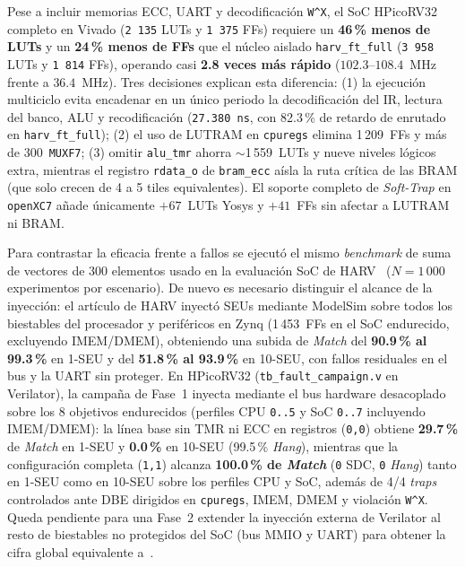 \documentclass[a4paper,10pt]{article}
\begin{document}
Pese a incluir memorias ECC, UART y decodificación \texttt{W\^{}X}, el SoC HPicoRV32 completo en Vivado (\texttt{2\,135} LUTs y \texttt{1\,375} FFs) requiere un \textbf{46\,\% menos de LUTs} y un \textbf{24\,\% menos de FFs} que el núcleo aislado \texttt{harv\_ft\_full} (\texttt{3\,958} LUTs y \texttt{1\,814} FFs), operando casi \textbf{2.8 veces más rápido} ($102.3$--$108.4$~MHz frente a $36.4$~MHz). Tres decisiones explican esta diferencia: (1) la ejecución multiciclo evita encadenar en un único periodo la decodificación del IR, lectura del banco, ALU y recodificación (\texttt{27.380~ns}, con 82.3\,\% de retardo de enrutado en \texttt{harv\_ft\_full}); (2) el uso de LUTRAM en \texttt{cpuregs} elimina 1\,209~FFs y más de 300~\texttt{MUXF7}; (3) omitir \texttt{alu\_tmr} ahorra $\sim$1\,559~LUTs y nueve niveles lógicos extra, mientras el registro \texttt{rdata\_o} de \texttt{bram\_ecc} aísla la ruta crítica de las BRAM (que solo crecen de 4 a 5 tiles equivalentes). El soporte completo de \textit{Soft-Trap} en \texttt{openXC7} añade únicamente $+67$~LUTs Yosys y $+41$~FFs sin afectar a LUTRAM ni BRAM.

Para contrastar la eficacia frente a fallos se ejecutó el mismo \textit{benchmark} de suma de vectores de 300 elementos usado en la evaluación SoC de HARV~\cite{santos2021microrel} ($N=1\,000$ experimentos por escenario). De nuevo es necesario distinguir el alcance de la inyección: el artículo de HARV inyectó SEUs mediante ModelSim sobre todos los biestables del procesador y periféricos en Zynq (1\,453~FFs en el SoC endurecido, excluyendo IMEM/DMEM), obteniendo una subida de \textit{Match} del \textbf{90.9\,\% al 99.3\,\%} en 1-SEU y del \textbf{51.8\,\% al 93.9\,\%} en 10-SEU, con fallos residuales en el bus y la UART sin proteger. En HPicoRV32 (\texttt{tb\_fault\_campaign.v} en Verilator), la campaña de Fase~1 inyecta mediante el bus hardware desacoplado sobre los 8 objetivos endurecidos (perfiles CPU \texttt{0..5} y SoC \texttt{0..7} incluyendo IMEM/DMEM): la línea base sin TMR ni ECC en registros (\texttt{0,0}) obtiene \textbf{29.7\,\%} de \textit{Match} en 1-SEU y \textbf{0.0\,\%} en 10-SEU (99.5\,\% \textit{Hang}), mientras que la configuración completa (\texttt{1,1}) alcanza \textbf{100.0\,\% de \textit{Match}} (\texttt{0} SDC, \texttt{0} \textit{Hang}) tanto en 1-SEU como en 10-SEU sobre los perfiles CPU y SoC, además de 4/4 \textit{traps} controlados ante DBE dirigidos en \texttt{cpuregs}, IMEM, DMEM y violación \texttt{W\^{}X}. Queda pendiente para una Fase~2 extender la inyección externa de Verilator al resto de biestables no protegidos del SoC (bus MMIO y UART) para obtener la cifra global equivalente a~\cite{santos2021microrel}.
\end{document}
